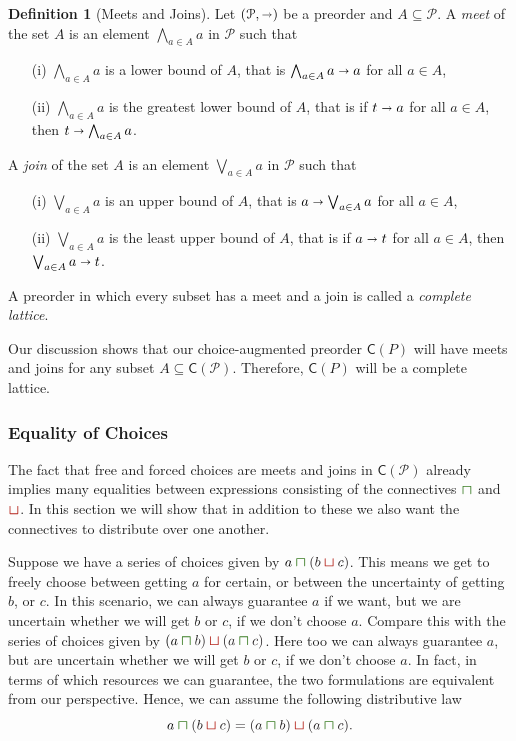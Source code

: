 \documentclass[12pt]{article}
\theoremstyle{definition}
\newtheorem{definition}{Definition}[section]
\theoremstyle{plain}
\theoremstyle{plain}
\theoremstyle{plain}
\theoremstyle{plain}
\theoremstyle{remark}
\theoremstyle{remark}
\newcommand{\mc}[1]{\mathcal{#1}}
\newcommand{\sub}{\subseteq}
\newcommand{\csqcap}{\color{OliveGreen}\bm{\sqcap}\color{Black}}
\newcommand{\csqcup}{\color{BrickRed}\bm{\sqcup}\color{Black}}
\begin{document}
\begin{definition}[Meets and Joins]\label{def:meets joins}
	Let $(\mc{P},\shortrightarrow)$ be a preorder and $A \sub \mc{P}$. A \emph{meet} of the set $A$ is an element $\bigwedge_{a \in A} a$ in $\mc{P}$ such that
	\begin{itemize}
		\item[(i)] $\bigwedge_{a \in A} a$ is a lower bound of $A$, that is $\bigwedge_{a \in A} a  \shortrightarrow a$ for all $a \in A$,
		\item[(ii)] $\bigwedge_{a \in A} a$ is the greatest lower bound of $A$, that is if $t \shortrightarrow a$ for all $a \in A$, then $t \shortrightarrow \bigwedge_{a \in A} a$.
	\end{itemize}
	A \emph{join} of the set $A$ is an element $\bigvee_{a \in A} a$ in $\mc{P}$ such that
	\begin{itemize}
		\item[(i)] $\bigvee_{a \in A} a$ is an upper bound of $A$, that is $a  \shortrightarrow \bigvee_{a \in A} a$ for all $a \in A$,
		\item[(ii)] $\bigvee_{a \in A} a$ is the least upper bound of $A$, that is if $a \shortrightarrow t$ for all $a \in A$, then $\bigvee_{a \in A} a \shortrightarrow t$.
	\end{itemize}
	A preorder in which every subset has a meet and a join is called a \emph{complete lattice}.
\end{definition}

Our discussion shows that our choice-augmented preorder $\mathsf{C}(P)$ will have meets and joins for any subset $A \sub \mathsf{C}(\mc{P})$. Therefore, $\mathsf{C}(P)$ will be a complete lattice.

\subsubsection{Equality of Choices}\label{sec:intr self}
The fact that free and forced choices are meets and joins in $\mathsf{C}(\mc{P})$ already implies many equalities between expressions consisting of the connectives $\csqcap$ and $\csqcup$. In this section we will show that in addition to these we also want the connectives to distribute over one another.

Suppose we have a series of choices given by $a \csqcap (b \csqcup c)$. This means we get to freely choose between getting $a$ for certain, or between the uncertainty of getting $b$, or $c$. In this scenario, we can always guarantee $a$ if we want, but we are uncertain whether we will get $b$ or $c$, if we don't choose $a$. Compare this with the series of choices given by $(a \csqcap b) \csqcup (a \csqcap c)$. Here too we can always guarantee $a$, but are uncertain whether we will get $b$ or $c$, if we don't choose $a$. In fact, in terms of which resources we can guarantee, the two formulations are equivalent from our perspective. Hence, we can assume the following distributive law $$a \csqcap (b \csqcup c) = (a \csqcap b) \csqcup (a \csqcap c).$$
\end{document}
